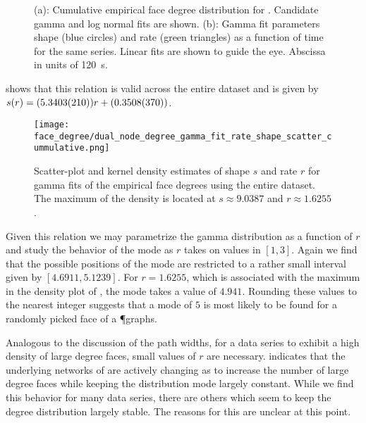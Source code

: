 		\begin{figure}
			\centering
			\qquad

			\caption[Face degree distribution]{(a): Cumulative empirical face degree distribution for . Candidate gamma and log normal fits are shown. (b): Gamma fit parameters shape (blue circles) and rate (green triangles) as a function of time for the same series. Linear fits are shown to guide the eye. Abscissa in units of \SI{120}{\second}.}
			\label{fig:face_degree_fit}
		\end{figure}

		 shows that this relation is valid across the entire dataset and is given by $s(r) = (\num{5.3403 \pm 0.021}) r + (\num{0.3508 \pm 0.037})$.
 
		\begin{figure}[!htbp]
			\centering
				\texttt{[image: face\_degree/dual\_node\_degree\_gamma\_fit\_rate\_shape\_scatter\_cummulative.png]}
			\caption[Face degree distribution - Fit parameter densities]{Scatter-plot and kernel density estimates of shape $s$ and rate $r$ for gamma fits of the empirical face degrees using the entire dataset. The maximum of the density is located at $s \approx 9.0387$ and $r \approx 1.6255$.}
			\label{fig:face_degree_kde}
		\end{figure}

		Given this relation we may parametrize the gamma distribution as a function of $r$ and study the behavior of the mode as $r$ takes on values in $[1,3]$. Again we find that the possible positions of the mode are restricted to a rather small interval given by $[4.6911,5.1239]$. For $r = 1.6255$, which is associated with the maximum in the density plot of , the mode takes a value of $4.941$. Rounding these values to the nearest integer suggests that a mode of $5$ is most likely to be found for a randomly picked face of a \P graphs.

		Analogous to the discussion of the path widths, for a data series to exhibit a high density of large degree faces, small values of $r$ are necessary.  indicates that the underlying networks of  are actively changing as to increase the number of large degree faces while keeping the distribution mode largely constant. While we find this behavior for many data series, there are others which seem to keep the degree distribution largely stable. The reasons for this are unclear at this point.



